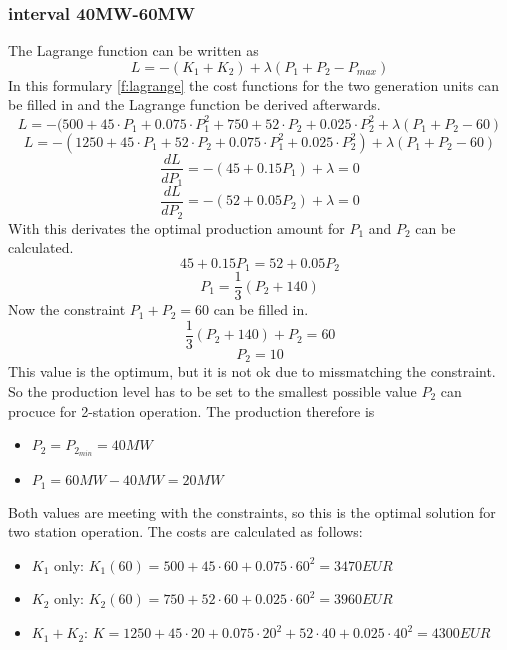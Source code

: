 \documentclass{article}
\begin{document}
	\subsubsection{interval 40MW-60MW}
		The Lagrange function can be written as
		\begin{equation}
			L=-(K_1+K_2)+\lambda(P_1+P_2-P_{max})
	 		\label{f:lagrange}
		\end{equation}
In this formulary \ref{f:lagrange} the cost functions for the two generation units can be filled in and the Lagrange function be derived afterwards.
		$$L=-(500+45\cdot P_1+0.075\cdot P_1^2+750+52\cdot P_2+0.025\cdot P_2^2+\lambda(P_1+P_2-60)$$
		$$L=-(1250+45\cdot P_1 + 52\cdot P_2 + 0.075\cdot P_1^2+0.025\cdot P_2^2)+\lambda(P_1+P_2-60)$$
		$$\frac{dL}{dP_1}=-(45+0.15P_1)+\lambda=0$$
		$$\frac{dL}{dP_2}=-(52+0.05P_2)+\lambda=0$$
With this derivates the optimal production amount for $P_1$ and $P_2$ can be calculated.
		$$45+0.15P_1=52+0.05P_2$$
		$$P_1=\frac{1}{3}(P_2+140)$$
	Now the constraint $P_1+P_2=60$ can be filled in.
		$$\frac{1}{3}(P_2+140)+P_2=60$$
		$$P_2=10$$
		This value is the optimum, but it is not ok due to missmatching the constraint. So the production level has to be set to the smallest possible value $P_2$ can procuce for 2-station operation. The production therefore is
		\begin{itemize}
			\item $P_2=P_{2_{min}}=40MW$
			\item $P_1=60MW-40MW=20MW$
		\end{itemize}
		Both values are meeting with the constraints, so this is the optimal solution for two station operation. The costs are calculated as follows:
		\begin{itemize}
			\item $K_1$ only: $K_1(60)=500+45\cdot 60+0.075\cdot 60^2=3470EUR$
			\item $K_2$ only: $K_2(60)=750+52\cdot 60+0.025\cdot 60^2=3960EUR$
			\item $K_1+K_2$: $K=1250+45\cdot 20+0.075\cdot 20^2 + 52\cdot 40+0.025\cdot 40^2=4300EUR$
		\end{itemize}
\end{document}
